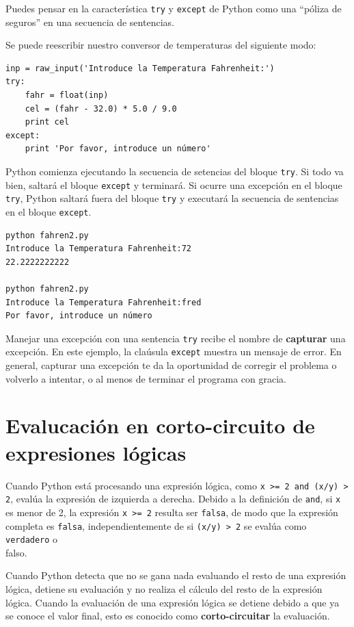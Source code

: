 Puedes pensar en la característica {\tt try} y {\tt except}
de Python como una ``póliza de seguros'' en una secuencia
de sentencias.

Se puede reescribir nuestro conversor de temperaturas del siguiente modo:

\beforeverb
\begin{verbatim}
inp = raw_input('Introduce la Temperatura Fahrenheit:')
try:
    fahr = float(inp)
    cel = (fahr - 32.0) * 5.0 / 9.0
    print cel
except:
    print 'Por favor, introduce un número'
\end{verbatim}
\afterverb
%

Python comienza ejecutando la
secuencia de setencias del bloque
{\tt try}. Si todo va bien,
saltará el bloque {\tt except} y terminará.
Si ocurre una excepción en el bloque {\tt try},
Python saltará fuera del bloque {\tt try} y
executará la secuencia de sentencias en el bloque {\tt except}.

\beforeverb
\begin{verbatim}
python fahren2.py 
Introduce la Temperatura Fahrenheit:72
22.2222222222

python fahren2.py 
Introduce la Temperatura Fahrenheit:fred
Por favor, introduce un número
\end{verbatim}
\afterverb
%

Manejar una excepción con una sentencia {\tt try} recibe el nombre de
{\bf capturar} una excepción. En este ejemplo, la claúsula {\tt except}
muestra un mensaje de error. En general,
capturar una excepción te da la oportunidad de corregir el problema
o volverlo a intentar, o al menos de terminar el programa con gracia.

\section{Evalucación en corto-circuito de expresiones lógicas}

Cuando Python está procesando una expresión lógica, como
{\tt x >= 2 and (x/y) > 2}, evalúa la expresión de
izquierda a derecha. Debido a la definición de {\tt and},
si {\tt x} es menor de 2, la expresión {\tt x >= 2} resulta ser
{\tt falsa}, de modo que la expresión completa es {\tt falsa}, independientemente
de si {\tt (x/y) > 2} se evalúa como {\tt verdadero} o {\\ falso}.

Cuando Python detecta que no se gana nada evaluando
el resto de una expresión lógica, detiene su evaluación y no
realiza el cálculo del resto de la expresión lógica.
Cuando la evaluación de una expresión lógica se detiene debido a que
ya se conoce el valor final, esto es conocido como {\bf corto-circuitar}
la evaluación.

